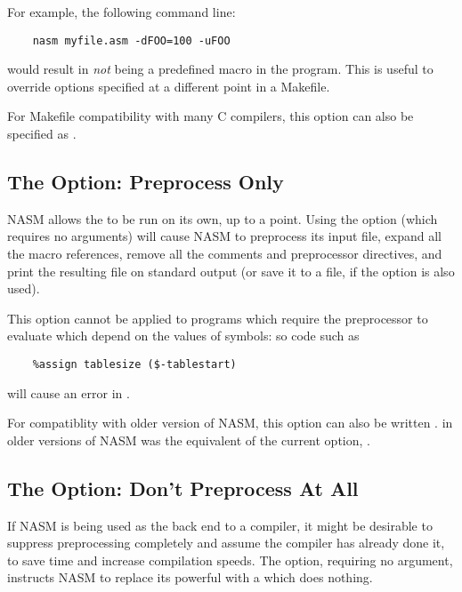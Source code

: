 For example, the following command line:

\begin{lstlisting}
	nasm myfile.asm -dFOO=100 -uFOO
\end{lstlisting}

would result in  \emph{not} being a predefined macro in the
program. This is useful to override options specified at a different
point in a Makefile.

For Makefile compatibility with many C compilers, this option can also
be specified as .

\subsection{The  Option: Preprocess Only}
\label{subsec:opt-E-cap}

NASM allows the  to be run on its own, up to a
point. Using the  option (which requires no arguments) will
cause NASM to preprocess its input file, expand all the macro references,
remove all the comments and preprocessor directives, and print the resulting
file on standard output (or save it to a file, if the  option
is also used).

This option cannot be applied to programs which require the
preprocessor to evaluate 
 which depend on the values of symbols:
so code such as

\begin{lstlisting}
	%assign tablesize ($-tablestart)
\end{lstlisting}

will cause an error in .

For compatiblity with older version of NASM, this option can also be
written .  in older versions of NASM was the equivalent
of the current  option, .

\subsection{The  Option: Don't Preprocess At All}
\label{subsec:opt-a}

If NASM is being used as the back end to a compiler, it might be
desirable to suppress preprocessing
completely and assume the compiler has already done it, to save time
and increase compilation speeds. The  option, requiring no
argument, instructs NASM to replace its powerful 
with a  which does nothing.

